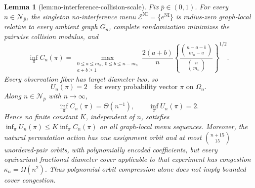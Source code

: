 \documentclass{article}
\newtheorem{lemma}{Lemma}
\begin{document}
\begin{lemma}[lem:no-interference-collision-scale]\label{lem:no-interference-collision-scale}
Fix \(\bar p\in(0,1)\). For every \(n\in\mathcal N_{\bar p}\), the singleton no-interference menu \(\mathcal E^{\mathrm{NI}}=\{e^{\mathrm{NI}}\}\) is radius-zero graph-local relative to every ambient graph \(G_n\), complete randomization minimizes the pairwise collision modulus, and
\[
 \inf_\pi C_n(\pi)
 =
 \max_{\substack{0\le a\le m_n,\ 0\le b\le n-m_n\\a+b\ge1}}
 \frac{2(a+b)}{n}
 \left\{
 \frac{\binom{n-a-b}{m_n-a}}{\binom n{m_n}}
 \right\}^{1/2}. \tag{1}
\]
Every observation fiber has target diameter two, so
\[
 U_n(\pi)=2\quad\text{for every probability vector \(\pi\) on \(\Omega_n\)}. \tag{2}
\]
Along \(n\in\mathcal N_{\bar p}\) with \(n\to\infty\),
\[
 \inf_\pi C_n(\pi)=\Theta(n^{-1}),
 \qquad
 \inf_\pi U_n(\pi)=2. \tag{3}
\]
Hence no finite constant \(K\), independent of \(n\), satisfies \(\inf_\pi U_n(\pi)\le K\inf_\pi C_n(\pi)\) on all graph-local menu sequences. Moreover, the natural permutation action has one assignment orbit and at most \(\binom{n+15}{15}\) unordered-pair orbits, with polynomially encoded coefficients, but every equivariant fractional diameter cover applicable to that experiment has congestion \(\kappa_n=\Omega(n^2)\). Thus polynomial orbit compression alone does not imply bounded cover congestion.
\end{lemma}
\end{document}
